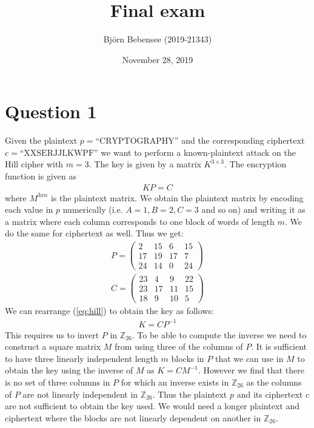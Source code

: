 \documentclass[11pt]{article}
\title{Final exam}
\author{Björn Bebensee (2019-21343)}
\date{November 28, 2019}
\begin{document}
\maketitle

\section*{Question 1}

Given the plaintext $p = \text{``CRYPTOGRAPHY''}$ and the corresponding ciphertext $c = \text{``XXSERJJLKWPF''}$ we want to perform a known-plaintext attack on the Hill cipher with $m=3$. The key is given by a matrix $K^{3 \times 3}$. The encryption function is given as
\begin{align} \label{eq:hill}
    KP = C
\end{align}
where $M^{3xn}$ is the plaintext matrix. We obtain the plaintext matrix by encoding each value in $p$ numerically (i.e. $A = 1, B = 2, C = 3$ and so on) and writing it as a matrix where each column corresponds to one block of words of length $m$. We do the same for ciphertext as well. Thus we get:
\begin{align*}
    P = 
        \begin{pmatrix}
            2 & 15 & 6 & 15 \\
            17 & 19 & 17 & 7 \\
            24 & 14 & 0 & 24
        \end{pmatrix} \\[5pt]
    C = 
        \begin{pmatrix}
            23 & 4 & 9 & 22 \\
            23 & 17 & 11 & 15 \\
            18 & 9 & 10 & 5
        \end{pmatrix}
\end{align*}
We can rearrange (\ref{eq:hill}) to obtain the key as follows:
\begin{align*}
    K = C P^{-1}
\end{align*}
This requires us to invert $P$ in $\mathbb{Z}_{26}$. To be able to compute the inverse we need to construct a square matrix $M$ from using three of the columns of $P$. It is sufficient to have three linearly independent length $m$ blocks in $P$ that we can use in $M$ to obtain the key using the inverse of $M$ as $K = C M^{-1}$. However we find that there is no set of three columns in $P$ for which an inverse exists in $\mathbb{Z}_{26}$ as the columns of $P$ are not linearly independent in $\mathbb{Z}_{26}$. Thus the plaintext $p$ and its ciphertext $c$ are not sufficient to obtain the key used. We would need a longer plaintext and ciphertext where the blocks are not linearly dependent on another in $\mathbb{Z}_{26}$.
\end{document}
